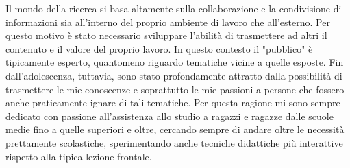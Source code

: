 \documentclass[a4paper,12pt]{article} %
\begin{document}
\begin{table}[h!]
\centering
{}
\end{table}

\Sep 



Il mondo della ricerca si basa altamente sulla collaborazione e la condivisione di informazioni sia all'interno del proprio ambiente di lavoro che all'esterno. Per questo motivo è stato necessario sviluppare l'abilità di trasmettere ad altri il contenuto e il valore del proprio lavoro. In questo contesto il "pubblico" è tipicamente 
esperto, quantomeno riguardo tematiche vicine a quelle esposte. Fin dall'adolescenza, tuttavia, sono stato profondamente attratto dalla possibilità di trasmettere le mie conoscenze e soprattutto le mie passioni a persone
che fossero anche praticamente ignare di tali tematiche. Per questa ragione mi sono sempre dedicato con passione all'assistenza allo studio a ragazzi e ragazze dalle scuole medie fino a quelle superiori e oltre, 
cercando sempre di andare oltre le necessità prettamente scolastiche, sperimentando anche tecniche didattiche più interattive rispetto alla tipica lezione frontale.

\clearpage
\userinformation
\framebreak

\end{document}
